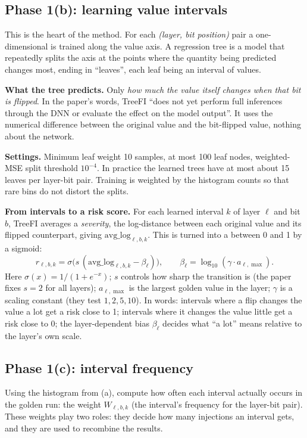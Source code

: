 \subsection{Phase 1(b): learning value intervals}
This is the heart of the method. For each \emph{(layer, bit position)} pair a one-dimensional  is trained along the value axis. A regression tree is a model that repeatedly splits the axis
at the points where the quantity being predicted changes most, ending in ``leaves'', each leaf being an interval of values.

\textbf{What the tree predicts.} Only \emph{how much the value itself changes when that bit is flipped}. In the paper's words, TreeFI ``does not yet perform full inferences through the DNN or evaluate the effect on the model output''. It uses the
numerical difference between the original value and the bit-flipped value, nothing about the network.

\textbf{Settings.} Minimum leaf weight 10 samples, at most 100 leaf nodes, weighted-MSE split threshold $10^{-4}$. In practice the learned trees have at most about 15 leaves per layer-bit pair. Training is weighted by the histogram counts so that rare bins do not distort the splits.

\textbf{From intervals to a risk score.} For each learned interval $k$ of layer $\ell$ and bit $b$, TreeFI averages a \emph{severity}, the log-distance between each original value and its flipped counterpart, giving $\mathrm{avg\_log}_{\ell,b,k}$.
This is turned into a  between 0 and 1 by a sigmoid:
\begin{equation}\label{eq:risk}
r_{\ell,b,k}=\sigma\bigl(s\,(\mathrm{avg\_log}_{\ell,b,k}-\beta_\ell)\bigr),\qquad \beta_\ell=\log_{10}(\gamma\cdot a_{\ell,\max}).
\end{equation}
Here $\sigma(x)=1/(1+e^{-x})$; $s$ controls how sharp the transition is (the paper fixes $s=2$ for all layers); $a_{\ell,\max}$ is the largest golden value in the layer; $\gamma$ is a scaling constant
(they test $1,2,5,10$). In words: intervals where a flip changes the value a lot get a risk close to 1; intervals where it changes the value little get a risk close to 0; the layer-dependent bias $\beta_\ell$ decides what ``a lot'' means relative to the layer's own scale.

\subsection{Phase 1(c): interval frequency}
Using the histogram from (a), compute how often each interval actually occurs in the golden run: the weight $W_{\ell,b,k}$ (the interval's frequency for the layer-bit pair). These weights play two roles: they decide how many injections an interval gets, and they are used to recombine the results.

